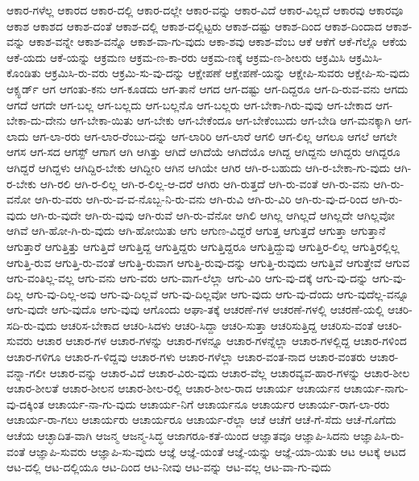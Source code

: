 {ಆಕಾರ-ಗಳೆಲ್ಲ
ಆಕಾರದ
ಆಕಾರ-ದಲ್ಲಿ
ಆಕಾರ-ದಲ್ಲೇ
ಆಕಾರ-ವನ್ನು
ಆಕಾರ-ವಿದೆ
ಆಕಾರ-ವಿಲ್ಲದೆ
ಆಕಾರವು
ಆಕಾರವೂ
ಆಕಾಶ
ಆಕಾಶದ
ಆಕಾಶ-ದಂತೆ
ಆಕಾಶ-ದಲ್ಲಿ
ಆಕಾಶ-ದಲ್ಲಿಟ್ಟರು
ಆಕಾಶ-ದಷ್ಟು
ಆಕಾಶ-ದಿಂದ
ಆಕಾಶ-ದಿಂದಾದ
ಆಕಾಶ-ವನ್ನು
ಆಕಾಶ-ವನ್ನೇ
ಆಕಾಶ-ವನ್ನೊ
ಆಕಾಶ-ವಾ-ಗು-ವುದು
ಆಕಾ-ಶವು
ಆಕಾಶ-ವೆಂಬ
ಆಕೆ
ಆಕೆಗೆ
ಆಕೆ-ಗೆಲ್ಲೊ
ಆಕೆಯ
ಆಕೆ-ಯದು
ಆಕೆ-ಯನ್ನು
ಆಕ್ರಮಣ
ಆಕ್ರಮ-ಣ-ಕಾ-ರರು
ಆಕ್ರಮ-ಣಕ್ಕೆ
ಆಕ್ರಮ-ಣ-ಶೀಲರು
ಆಕ್ರಮಿಸಿ
ಆಕ್ರಮಿಸಿ-ಕೊಂಡಿತು
ಆಕ್ರಮಿಸಿ-ರು-ವರು
ಆಕ್ರಮಿ-ಸು-ವು-ದನ್ನು
ಆಕ್ಷೇಪಣೆ
ಆಕ್ಷೇಪಣೆ-ಯನ್ನು
ಆಕ್ಷೇಪಿ-ಸುವರು
ಆಕ್ಷೇಪಿ-ಸು-ವುದು
ಆಕ್ಸ್ಫರ್ಡ್
ಆಗ
ಆಗಂತು-ಕನು
ಆಗ-ಕೂಡದು
ಆಗ-ತಾನೆ
ಆಗದ
ಆಗ-ದಷ್ಟು
ಆಗ-ದಿದ್ದರೂ
ಆಗ-ದಿ-ರುವ-ವನು
ಆಗದು
ಆಗದೆ
ಆಗದೇ
ಆಗ-ಬಲ್ಲ
ಆಗ-ಬಲ್ಲದು
ಆಗ-ಬಲ್ಲನೊ
ಆಗ-ಬಲ್ಲರು
ಆಗ-ಬೇಕಾ-ಗಿರು-ವುವು
ಆಗ-ಬೇಕಾದ
ಆಗ-ಬೇಕಾ-ದು-ದೇನು
ಆಗ-ಬೇಕಾ-ಯಿತು
ಆಗ-ಬೇಕು
ಆಗ-ಬೇಕೆಂದೂ
ಆಗ-ಬೇಕೆಂಬುದು
ಆಗ-ಬೇಡಿ
ಆಗ-ಮನಕ್ಕಾಗಿ
ಆಗ-ಲಾದು
ಆಗ-ಲಾ-ರರು
ಆಗ-ಲಾರ-ರೆಂಬು-ದನ್ನು
ಆಗ-ಲಾರಿರಿ
ಆಗ-ಲಾರೆ
ಆಗಲಿ
ಆಗ-ಲಿಲ್ಲ
ಆಗಲೂ
ಆಗಲೆ
ಆಗಲೇ
ಆಗಸ
ಆಗ-ಸದ
ಆಗಸ್ಟ್
ಆಗಾಗ
ಆಗಿ
ಆಗಿತ್ತು
ಆಗಿದೆ
ಆಗಿದೆಯೆ
ಆಗಿದೆಯೊ
ಆಗಿದ್ದ
ಆಗಿದ್ದನು
ಆಗಿದ್ದರು
ಆಗಿದ್ದರೂ
ಆಗಿದ್ದರೆ
ಆಗಿದ್ದಳು
ಆಗಿದ್ದಿರ-ಬೇಕು
ಆಗಿದ್ದೀರಿ
ಆಗಿನ
ಆಗಿಯೇ
ಆಗಿರ
ಆಗಿ-ರ-ಬಹುದು
ಆಗಿ-ರ-ಬೇಕಾ-ಗು-ವುದು
ಆಗಿ-ರ-ಬೇಕು
ಆಗಿ-ರಲಿ
ಆಗಿ-ರ-ಲಿಲ್ಲ
ಆಗಿ-ರ-ಲಿಲ್ಲ-ಆ-ದರೆ
ಆಗಿರು
ಆಗಿ-ರುತ್ತದೆ
ಆಗಿ-ರು-ವಂತೆ
ಆಗಿ-ರು-ವನು
ಆಗಿ-ರು-ವನೋ
ಆಗಿ-ರು-ವರು
ಆಗಿ-ರು-ವ-ವ-ನೊಬ್ಬ-ನಿ-ರು-ವನು
ಆಗಿ-ರುವಿ
ಆಗಿ-ರು-ವಿರಿ
ಆಗಿ-ರು-ವು-ದ-ರಿಂದ
ಆಗಿ-ರು-ವುದು
ಆಗಿ-ರು-ವುದೇ
ಆಗಿ-ರು-ವುವು
ಆಗಿ-ರುವೆ
ಆಗಿ-ರು-ವೆನೋ
ಆಗಿಲಿ
ಆಗಿಲ್ಲ
ಆಗಿಲ್ಲದೆ
ಆಗಿಲ್ಲದೇ
ಆಗಿಲ್ಲವೋ
ಆಗಿವೆ
ಆಗಿ-ಹೋ-ಗಿ-ರು-ವುದು
ಆಗಿ-ಹೋಯಿತು
ಆಗು
ಆಗುಣ-ವಿದ್ದರೆ
ಆಗುತ್ತ
ಆಗುತ್ತದೆ
ಆಗುತ್ತಾ
ಆಗುತ್ತಾನೆ
ಆಗುತ್ತಾರೆ
ಆಗುತ್ತಿತ್ತು
ಆಗುತ್ತಿದೆ
ಆಗುತ್ತಿದ್ದ
ಆಗುತ್ತಿದ್ದರು
ಆಗುತ್ತಿದ್ದರೂ
ಆಗುತ್ತಿದ್ದುವು
ಆಗುತ್ತಿರ-ಲಿಲ್ಲ
ಆಗುತ್ತಿರಲ್ಲಿಲ್ಲ
ಆಗುತ್ತಿ-ರುವ
ಆಗುತ್ತಿ-ರು-ವಂತೆ
ಆಗುತ್ತಿ-ರುವಾಗ
ಆಗುತ್ತಿ-ರುವು-ದನ್ನು
ಆಗುತ್ತಿ-ರುವುದು
ಆಗುತ್ತಿವೆ
ಆಗುತ್ತೇವೆ
ಆಗುವ
ಆಗು-ವಂತಿಲ್ಲ-ವಲ್ಲ
ಆಗು-ವನು
ಆಗು-ವರು
ಆಗು-ವಾಗ-ಲೆಲ್ಲಾ
ಆಗು-ವಿರಿ
ಆಗು-ವು-ದಕ್ಕೆ
ಆಗು-ವು-ದನ್ನು
ಆಗು-ವು-ದಿಲ್ಲ
ಆಗು-ವು-ದಿಲ್ಲ-ಅವು
ಆಗು-ವು-ದಿಲ್ಲವೆ
ಆಗು-ವು-ದಿಲ್ಲವೋ
ಆಗು-ವುದು
ಆಗು-ವು-ದೆಂದು
ಆಗು-ವುದೆಲ್ಲ-ವನ್ನೂ
ಆಗು-ವುದೇ
ಆಗು-ವುದೊ
ಆಗು-ವುವು
ಆಗೊಂದು
ಆಘಾ-ತಕ್ಕೆ
ಆಚರಣೆ-ಗಳ
ಆಚರಣೆ-ಗಳಲ್ಲಿ
ಆಚರಣೆ-ಯಲ್ಲಿ
ಆಚರಿ-ಸದಿ-ರು-ವುದು
ಆಚರಿಸ-ಬೇಕಾದ
ಆಚರಿ-ಸಿದಳು
ಆಚರಿ-ಸಿದ್ದಾ
ಆಚರಿ-ಸುತ್ತಾ
ಆಚರಿಸುತ್ತಿದ್ದ
ಆಚರಿಸು-ವಂತೆ
ಆಚರಿ-ಸುವರು
ಆಚಾರ
ಆಚಾರ-ಗಳ
ಆಚಾರ-ಗಳನ್ನು
ಆಚಾರ-ಗಳನ್ನೂ
ಆಚಾರ-ಗಳನ್ನೆಲ್ಲಾ
ಆಚಾರ-ಗಳಲ್ಲಿದ್ದ
ಆಚಾರ-ಗಳಿಂದ
ಆಚಾರ-ಗಳಿಗೂ
ಆಚಾರ-ಗ-ಳಿದ್ದವು
ಆಚಾರ-ಗಳು
ಆಚಾರ-ಗಳೆಲ್ಲಾ
ಆಚಾರ-ವಂತ-ನಾದ
ಆಚಾರ-ವಂತರು
ಆಚಾರ-ವನ್ನಾ-ಗಲೀ
ಆಚಾರ-ವನ್ನು
ಆಚಾರ-ವಿದೆ
ಆಚಾರ-ವಿರು-ವುದು
ಆಚಾರ-ವೆಲ್ಲ
ಆಚಾರವ್ಯವ-ಹಾರ-ಗಳನ್ನು
ಆಚಾರ-ಶೀಲ
ಆಚಾರ-ಶೀಲತೆ
ಆಚಾರ-ಶೀಲನ
ಆಚಾರ-ಶೀಲ-ರಲ್ಲಿ
ಆಚಾರ-ಶೀಲ-ರಾದ
ಆಚಾರ್ಯ
ಆಚಾರ್ಯನ
ಆಚಾರ್ಯ-ನಾಗು-ವು-ದಕ್ಕಿಂತ
ಆಚಾರ್ಯ-ನಾ-ಗು-ವುದು
ಆಚಾರ್ಯ-ನಿಗೆ
ಆಚಾರ್ಯನೂ
ಆಚಾರ್ಯರ
ಆಚಾರ್ಯ-ರಾಗ-ಲಾ-ರರು
ಆಚಾರ್ಯ-ರಾ-ಗಲು
ಆಚಾರ್ಯರು
ಆಚಾರ್ಯರೂ
ಆಚಾರ್ಯ-ರೆಲ್ಲಾ
ಆಚೆ
ಆಚೆಗೆ
ಆಚೆ-ಗೆ-ಸೆದು
ಆಚೆ-ಗೊಗೆದು
ಆಚೆಯ
ಆಚ್ಛಾದಿತ-ವಾಗಿ
ಆಜನ್ಮ
ಆಜನ್ಮ-ಸಿದ್ಧ
ಆಜಾಗರೂ-ಕತೆ-ಯಿಂದ
ಆಜ್ಞಾತವೂ
ಆಜ್ಞಾಪಿ-ಸಿದನು
ಆಜ್ಞಾಪಿಸಿ-ರು-ವಂತೆ
ಆಜ್ಞಾಪಿ-ಸುವರು
ಆಜ್ಞಾಪಿ-ಸು-ವುದು
ಆಜ್ಞೆ
ಆಜ್ಞೆ-ಯಂತೆ
ಆಜ್ಞೆ-ಯನ್ನು
ಆಜ್ಞೆ-ಯಾ-ಯಿತು
ಆಟ
ಆಟಕ್ಕೆ
ಆಟದ
ಆಟ-ದಲ್ಲಿ
ಆಟ-ದಲ್ಲಿಯೂ
ಆಟ-ದಿಂದ
ಆಟ-ನೀವು
ಆಟ-ವನ್ನು
ಆಟ-ವಲ್ಲ
ಆಟ-ವಾ-ಗು-ವುದು
}
